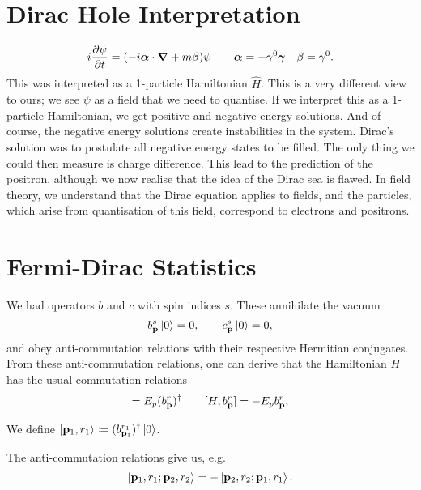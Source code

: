 
\section*{Dirac Hole Interpretation}%
\label{sec:dirac_hole_interpretation}

\begin{equation}
  i \frac{\partial \psi}{\partial t} = (-i \boldsymbol\alpha \cdot \grad + m \beta) \psi \qquad \boldsymbol\alpha = - \gamma^0 \boldsymbol \gamma \quad \beta = \gamma^0.
\end{equation}
This was interpreted as a 1-particle Hamiltonian $\hat{H}$. This is a very different view to ours; we see $\psi$ as a field that we need to quantise.
If we interpret this as a 1-particle Hamiltonian, we get positive and negative energy solutions. And of course, the negative energy solutions create instabilities in the system. Dirac's solution was to postulate all negative energy states to be filled.
The only thing we could then measure is charge difference. This lead to the prediction of the positron, although we now realise that the idea of the Dirac sea is flawed.
In field theory, we understand that the Dirac equation applies to fields, and the particles, which arise from quantisation of this field, correspond to electrons and positrons.

\section{Fermi-Dirac Statistics}%
\label{sec:fermi_dirac_statistics}

We had operators $b$ and $c$ with spin indices $s$. These annihilate the vacuum
\begin{equation}
  b^{s}_{\vb{p}} \ket{0} = 0, \qquad c^{s}_{\vb{p}} \ket{0} = 0,
\end{equation}
and obey anti-commutation relations with their respective Hermitian conjugates.
From these anti-commutation relations, one can derive that the Hamiltonian $H$ has the usual commutation relations
\begin{equation}
  [H, (b^{r}_{\vb{p}})^{\dagger}] = E_{p} (b^{r}_{\vb{p}})^{\dagger} \qquad [H, b^{r}_{\vb{p}}] = - E_{p} b^{r}_{\vb{p}},
\end{equation}
 \begin{notation}[]
   We define $\ket{\vb{p}_1, r_1} \coloneqq (b^{r_1}_{\vb{p}_1})^{\dagger} \ket{0}$.
\end{notation}
The anti-commutation relations give us, e.g.
\begin{equation}
  \ket{\vb{p}_1, r_1; \vb{p}_2, r_2} = -\ket{\vb{p}_2, r_2; \vb{p}_1, r_1}.
\end{equation}

